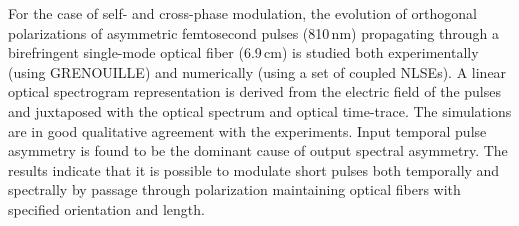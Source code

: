 For the case of self- and cross-phase modulation, the evolution of orthogonal polarizations of asymmetric femtosecond pulses (810\,nm) propagating through  a birefringent single-mode optical fiber (6.9\,cm) is studied both experimentally (using GRENOUILLE) and numerically (using a set of coupled NLSEs). A linear optical spectrogram representation is derived from the electric field of the pulses and juxtaposed with the optical spectrum and optical time-trace. The simulations are 
in good qualitative agreement with the experiments. Input temporal pulse asymmetry is found to be the dominant cause of output spectral asymmetry. The results indicate that it is possible to modulate short pulses both temporally and spectrally by passage through polarization maintaining optical fibers with specified orientation and length.


